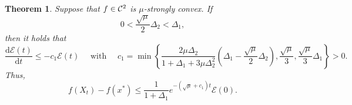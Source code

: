 \documentclass[11pt]{article}
\newcommand{\1}{\mathbf 1}
\numberwithin{equation}{section}
\newtheorem{THM}{Theorem}
\begin{document}
\begin{THM}
\label{faster convergence rate for general ODE}
Suppose that $f\in{\cal C}^2$ is $\mu$-strongly convex.
If 
\begin{equation*}
    \label{faster continuous condition}
    0<\frac{\sqrt{\mu}}{2}\Delta_2< \Delta_1, 
\end{equation*}
then it holds that
\begin{equation*}  
 \frac{\mathrm{d}\mathcal{E}(t)}{\mathrm{d}t} \leqslant -c_1\mathcal{E}(t) \quad \mbox{ with } \quad c_1=\min \left\{ \frac{2\mu\Delta_2}{1+\Delta_1+3\mu\Delta_2^2}(\Delta_1-\frac{\sqrt{\mu}}{2}\Delta_2),\frac{\sqrt{\mu}}{3},\frac{\sqrt{\mu}}{3}\Delta_1  \right\}>0.
\end{equation*}
Thus, 
\begin{equation*}
        f(X_t)-f(x^*)\leqslant \frac{1}{1+\Delta_1}e^{-(\sqrt{\mu}+c_1)t}\mathcal{E}(0).
\end{equation*}
\end{THM}
\end{document}
